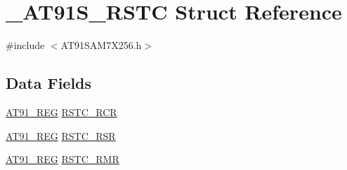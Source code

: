 \hypertarget{struct__AT91S__RSTC}{\section{\-\_\-\-A\-T91\-S\-\_\-\-R\-S\-T\-C Struct Reference}
\label{struct__AT91S__RSTC}
}


{\ttfamily \#include $<$A\-T91\-S\-A\-M7\-X256.\-h$>$}

\subsection*{Data Fields}
\begin{DoxyCompactItemize}
\item 
\hyperlink{GCC_2ARM7__AT91SAM7S_2AT91SAM7X256_8h_a712ad5a1ac1bd02f3e95a7526c283ce1}{A\-T91\-\_\-\-R\-E\-G} \hyperlink{struct__AT91S__RSTC_a43683180657ab3ca1fe46b233b8cbf52}{R\-S\-T\-C\-\_\-\-R\-C\-R}
\item 
\hyperlink{GCC_2ARM7__AT91SAM7S_2AT91SAM7X256_8h_a712ad5a1ac1bd02f3e95a7526c283ce1}{A\-T91\-\_\-\-R\-E\-G} \hyperlink{struct__AT91S__RSTC_af5f89e2cc25c4435f046ef4b53d3f298}{R\-S\-T\-C\-\_\-\-R\-S\-R}
\item 
\hyperlink{GCC_2ARM7__AT91SAM7S_2AT91SAM7X256_8h_a712ad5a1ac1bd02f3e95a7526c283ce1}{A\-T91\-\_\-\-R\-E\-G} \hyperlink{struct__AT91S__RSTC_a94062b99900bea54ab1e8d7bb1295416}{R\-S\-T\-C\-\_\-\-R\-M\-R}
\end{DoxyCompactItemize}


